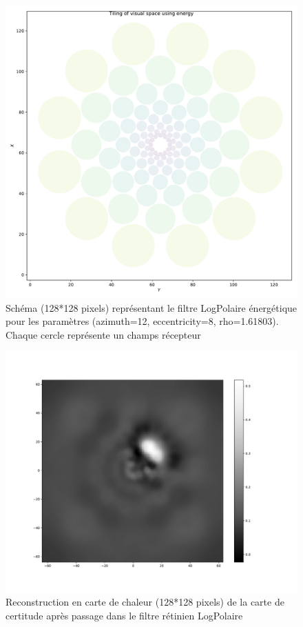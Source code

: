 \begin{figure}[th]
\centering
\includegraphics[scale=0.4]{Figures/colliculus_filter}
\decoRule
\caption[Figure]{Schéma (128*128 pixels) représentant le filtre LogPolaire énergétique pour les paramètres (azimuth=12, eccentricity=8, rho=1.61803). Chaque cercle représente un champs récepteur}
\label{fig:energy_filter}
\end{figure}

\begin{figure}[th]
\centering
\includegraphics[scale=0.4]{Figures/accuracy_colliculus}
\decoRule
\caption[Figure]{Reconstruction en carte de chaleur (128*128 pixels) de la carte de certitude après passage dans le filtre rétinien LogPolaire}
\label{fig:accuracy_128_LP}
\end{figure}

